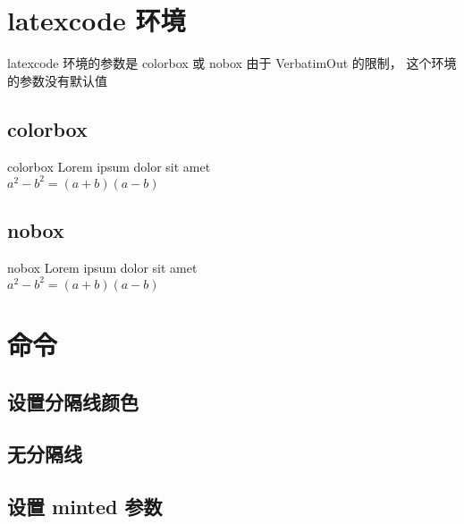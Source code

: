 \documentclass{ctexart}
\begin{document}
\section{ latexcode 环境 }

latexcode 环境的参数是 colorbox 或 nobox 
由于 VerbatimOut 的限制， 这个环境的参数没有默认值

\subsection{colorbox}

\begin{latexcode}{colorbox}
Lorem ipsum dolor sit amet\\
$a^2 - b^2 = (a+b)(a-b)$ 
\end{latexcode}

\subsection{nobox}

\begin{latexcode}{nobox}
Lorem ipsum dolor sit amet\\
$a^2 - b^2 = (a+b)(a-b)$ 
\end{latexcode}

\section{\protect{}命令}

\subsection{设置分隔线颜色 \protect\verbum{[color=cyan]}}


\subsection{无分隔线 \protect\verbum{[color=\{\}]}}


\subsection{设置 minted 参数 \protect\verbum{[mint=\{linenos\}]}}

\end{document}
